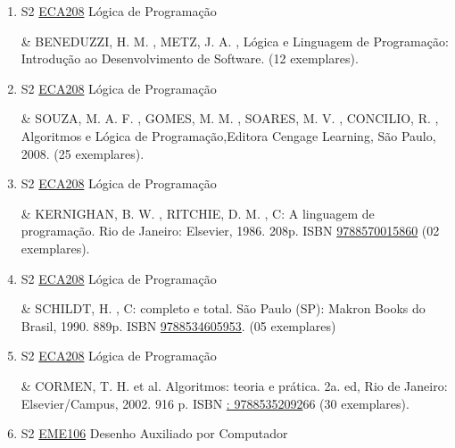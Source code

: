 \documentclass[12pt,a4paper]{book}
\begin{document}
\begin{enumerate}
& ZIVIANI, N. , Projeto de algoritmos: com implementações em Java e C++.  São Paulo (SP): Thomson Learning, 2007.  ISBN \href{http://www.bn.br/site/pages/servicosProfissionais/agenciaISBN/isbnBusca/FbnBuscaISBNCatalogo.asp?pField=ISBN&pIntPagina=1&pISBN=22105250&nidbISBN=true&hidbISBN=true}{9788522105250}.  (10 exemplares)

 

 \item S2 \hyperref[PUD:ECA208]{ECA208} Lógica de Programação

& BENEDUZZI, H.  M. , METZ, J.  A. , Lógica e Linguagem de Programação: Introdução ao Desenvolvimento de Software.  (12 exemplares). 

 

 \item S2 \hyperref[PUD:ECA208]{ECA208} Lógica de Programação

& SOUZA, M.  A.  F. , GOMES, M.  M. , SOARES, M.  V. , CONCILIO, R. , Algoritmos e Lógica de Programação,Editora Cengage Learning, São Paulo, 2008.  (25 exemplares).
 \item S2 \hyperref[PUD:ECA208]{ECA208} Lógica de Programação

& KERNIGHAN, B.  W. , RITCHIE, D.  M. , C: A linguagem de programação.  Rio de Janeiro: Elsevier, 1986.  208p.  ISBN \href{http://www.bn.br/site/pages/servicosProfissionais/agenciaISBN/isbnBusca/FbnBuscaISBNCatalogo.asp?pField=ISBN&pIntPagina=1&pISBN=70015860&nidbISBN=true&hidbISBN=true}{9788570015860} (02 exemplares). 

 

 \item S2 \hyperref[PUD:ECA208]{ECA208} Lógica de Programação

& SCHILDT, H. , C: completo e total.  São Paulo (SP): Makron Books do Brasil, 1990.  889p.  ISBN \href{http://www.bn.br/site/pages/servicosProfissionais/agenciaISBN/isbnBusca/FbnBuscaISBNCatalogo.asp?pField=ISBN&pIntPagina=1&pISBN=34605953&nidbISBN=true&hidbISBN=true}{9788534605953}.  (05 exemplares)

 

 \item S2 \hyperref[PUD:ECA208]{ECA208} Lógica de Programação

&  CORMEN, T.  H.  et al.  Algoritmos: teoria e prática.  2a.  ed, Rio de Janeiro: Elsevier/Campus, 2002.  916 p.  ISBN \href{http://www.google.com/search?hl=pt-BR&tbo=p&tbm=bks&q=isbn:: 97885352092&num=10}{: 97885352092}66  (30 exemplares).
 \item S2 \hyperref[PUD:EME106]{EME106} Desenho Auxiliado por Computador


\end{enumerate}
\end{document}
